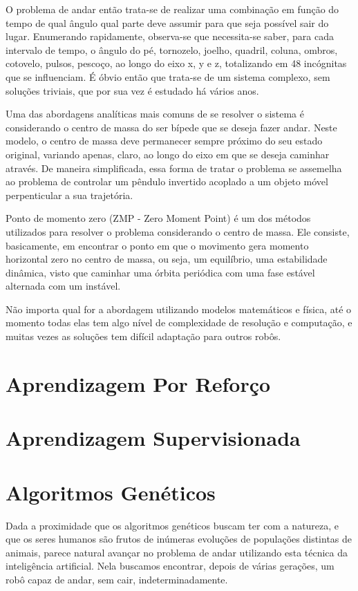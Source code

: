 \documentclass[twoside,conference,a4paper]{IEEEtran}
\begin{document}
O problema de andar então trata-se de realizar uma combinação em função do tempo de qual ângulo qual parte deve assumir para que seja possível sair do lugar. Enumerando rapidamente, observa-se que necessita-se saber, para cada intervalo de tempo, o ângulo do pé, tornozelo, joelho, quadril, coluna, ombros, cotovelo, pulsos, pescoço, ao longo do eixo x, y e z, totalizando em 48 incógnitas que se influenciam. É óbvio então que trata-se de um sistema complexo, sem soluções triviais, que por sua vez é estudado há vários anos.

Uma das abordagens analíticas mais comuns de se resolver o sistema é considerando o centro de massa do ser bípede que se deseja fazer andar. Neste modelo, o centro de massa deve permanecer sempre próximo do seu estado original, variando apenas, claro, ao longo do eixo em que se deseja caminhar através. De maneira simplificada, essa forma de tratar o problema se assemelha ao problema de controlar um pêndulo invertido acoplado a um objeto móvel perpenticular a sua trajetória.

Ponto de momento zero (ZMP - Zero Moment Point) é um dos métodos utilizados para resolver o problema considerando o centro de massa. Ele consiste, basicamente, em encontrar o ponto em que o movimento gera momento horizontal zero no centro de massa, ou seja, um equilíbrio, uma estabilidade dinâmica, visto que caminhar uma órbita periódica com uma fase estável alternada com um instável.

Não importa qual for a abordagem utilizando modelos matemáticos e física, até o momento todas elas tem algo nível de complexidade de resolução e computação, e muitas vezes as soluções tem difícil adaptação para outros robôs.

\section{Aprendizagem Por Reforço} \label{aprendizagem_por_reforco}

\section{Aprendizagem Supervisionada} \label{aprendizagem_supervisionada}

\section{Algoritmos Genéticos} \label{algoritmos_geneticos}
Dada a proximidade que os algoritmos genéticos buscam ter com a natureza, e que os seres humanos são frutos de inúmeras evoluções de populações distintas de animais, parece natural avançar no problema de andar utilizando esta técnica da inteligência artificial. Nela buscamos encontrar, depois de várias gerações, um robô capaz de andar, sem cair, indeterminadamente.
\end{document}
